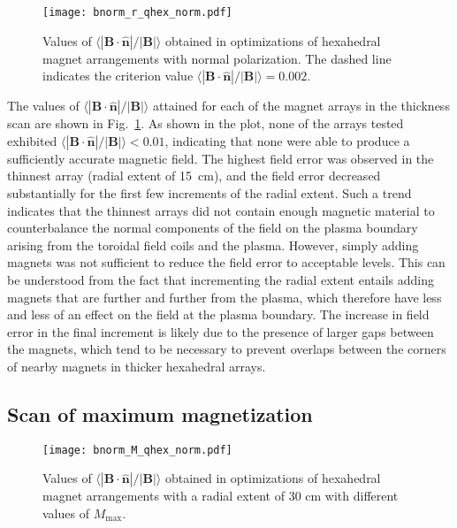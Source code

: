 \documentclass[11pt,onecolumn]{article}
\newcommand{\relbnorm}{\langle|\mathbf{B}\cdot\hat{\mathbf{n}}|
                       /|\mathbf{B}|\rangle}
\begin{document}
\begin{figure}
    \begin{center}
    \texttt{[image: bnorm\_r\_qhex\_norm.pdf]}
    \caption{Values of $\relbnorm$ obtained in optimizations of hexahedral
             magnet arrangements with normal polarization. The dashed line
             indicates the criterion value $\relbnorm=0.002$.}
    \label{fig:bnorm_r_qhex_norm}
    \end{center}
\end{figure}

The values of $\relbnorm$ attained
for each of the magnet arrays in the thickness scan are shown in 
Fig.~\ref{fig:bnorm_r_qhex_norm}. As shown in the plot, none of the arrays
tested exhibited $\relbnorm<0.01$, indicating that
none were able to produce a sufficiently accurate magnetic field. The highest
field error was observed in the thinnest array (radial extent of 15~cm),
and the field error decreased substantially for the first few increments 
of the radial extent. Such a trend indicates that the thinnest arrays did not
contain enough magnetic material to counterbalance the normal components
of the field on the plasma boundary arising from the toroidal field coils and 
the plasma. However, simply adding magnets
was not sufficient to reduce the field error to acceptable levels. 
This can be understood from the fact that incrementing the radial extent
entails adding magnets that are further and further from the plasma, which 
therefore have less and less of an effect on the field at the plasma boundary.
The increase in field error in the final increment is likely due to the 
presence of larger gaps between the magnets, which tend to be necessary
to prevent overlaps between the corners of nearby magnets in thicker 
hexahedral arrays.

\subsection{Scan of maximum magnetization}
\label{ssect:qhex_M_scan_normal}

\begin{figure}
    \begin{center}
    \texttt{[image: bnorm\_M\_qhex\_norm.pdf]}
    \caption{Values of $\relbnorm$ obtained in optimizations of hexahedral
             magnet arrangements with a radial extent of 30 cm with 
             different values of $M_\text{max}$.}
    \label{fig:bnorm_M_qhex_norm}
    \end{center}
\end{figure}
\end{document}
